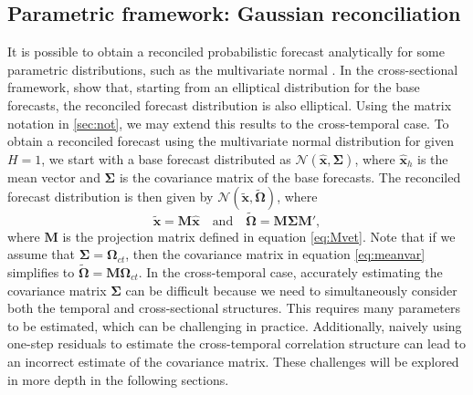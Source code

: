 \documentclass[a4paper,11pt]{article}
\newcommand{\xvet}{\bm{x}}
\newcommand{\Mvet}{\bm{M}}
\newcommand{\Omegavet}{\bm{\Omega}}
\newcommand{\Sigmavet}{\bm{\Sigma}}
\theoremstyle{definition}
\begin{document}
\subsection{Parametric framework: Gaussian reconciliation}\label{ssec:prob_pf}

It is possible to obtain a reconciled probabilistic forecast analytically for some parametric distributions, such as the multivariate normal \citep{panagiotelis2023, wickramasuriya2021b, corani2021, eckert2021}. In the cross-sectional framework, \cite{panagiotelis2023} show that, starting from an elliptical distribution for the base forecasts, the reconciled forecast distribution is also elliptical. Using the matrix notation in \autoref{sec:not}, we may extend this results to the cross-temporal case.
To obtain a reconciled forecast using the multivariate normal distribution for given $H = 1$, we start with a base forecast distributed as $\mathcal{N}(\widehat{\xvet}, \Sigmavet)$, where $\widehat{\xvet}_h$ is the mean vector and $\Sigmavet$ is the covariance matrix of the base forecasts. The reconciled forecast distribution is then given by $\mathcal{N}(\widetilde{\xvet}, \widetilde{\Omegavet})$, where
\begin{equation}\label{eq:meanvar}
	\widetilde{\xvet} = \Mvet\widehat{\xvet} \quad \mbox{and} \quad \widetilde{\Omegavet} = \Mvet \Sigmavet \Mvet',
\end{equation}
where $\Mvet$ is the projection matrix defined in equation \eqref{eq:Mvet}.
Note that if we assume that $\Sigmavet = \Omegavet_{ct}$, then the covariance matrix in equation \eqref{eq:meanvar} simplifies to $\widetilde{\Omegavet} = \Mvet \Omegavet_{ct}$.
In the cross-temporal case, accurately estimating the covariance matrix $\Sigmavet$ can be difficult because we need to simultaneously consider both the temporal and cross-sectional structures. This requires many parameters to be estimated, which can be challenging in practice. Additionally, naively using one-step residuals to estimate the cross-temporal correlation structure can lead to an incorrect estimate of the covariance matrix. These challenges will be explored in more depth in the following sections.
\end{document}
